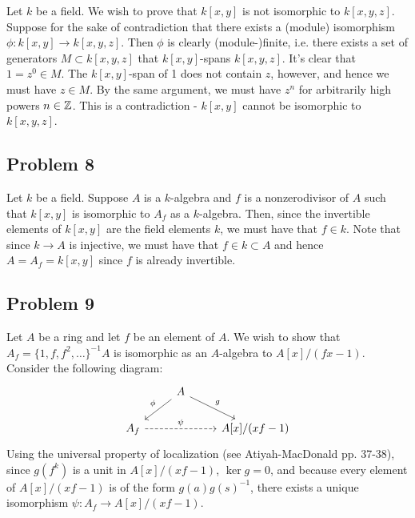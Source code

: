 \documentclass{../../mathnotes}
\begin{document}
Let $k$ be a field. We wish to prove that $k[x,y]$ is not isomorphic to $k[x,y,z]$. Suppose for the sake of contradiction
that there exists a (module) isomorphism $\phi: k[x,y]\to k[x,y,z]$. Then $\phi$ is clearly (module-)finite, i.e. there exists a
set of generators $M\subset k[x,y,z]$ that $k[x,y]$-spans $k[x,y,z]$. It's clear that $1=z^0\in M$. The $k[x,y]$-span of 1
does not contain $z$, however, and hence we must have $z\in M$. By the same argument, we must have $z^n$ for arbitrarily high
powers $n\in\mathbb{Z}$. This is a contradiction - $k[x,y]$ cannot be isomorphic to $k[x,y,z]$.

\subsection*{Problem 8}

Let $k$ be a field. Suppose $A$ is a $k$-algebra and $f$ is a nonzerodivisor of $A$ such that $k[x,y]$ is isomorphic to $A_f$
as a $k$-algebra. Then, since the invertible elements of $k[x,y]$ are the field elements $k$, we must have that $f\in k$. Note
that since $k\to A$ is injective, we must have that $f\in k\subset A$ and hence $A=A_f=k[x,y]$ since $f$ is already invertible.

\subsection*{Problem 9}

Let $A$ be a ring and let $f$ be an element of $A$. We wish to show that $A_f=\{1,f,f^2,\ldots\}^{-1}A$ is isomorphic as an
$A$-algebra to $A[x]/(fx-1)$. Consider the following diagram:
\begin{equation*}
    \begin{tikzcd}
        {} & A\arrow[swap]{ld}{\phi}\arrow{rd}{g} &  \\
        A_f\arrow[dashed]{rr}{\psi} &  & A[x]/(xf-1)
    \end{tikzcd}
\end{equation*}
Using the universal property of localization (see Atiyah-MacDonald pp. 37-38), since $g(f^k)$ is a unit in $A[x]/(xf-1)$,
$\ker g=0$, and because every element of $A[x]/(xf-1)$ is of the form $g(a)g(s)^{-1}$, there exists a unique isomorphism
$\psi:A_f\to A[x]/(xf-1)$.
\end{document}
